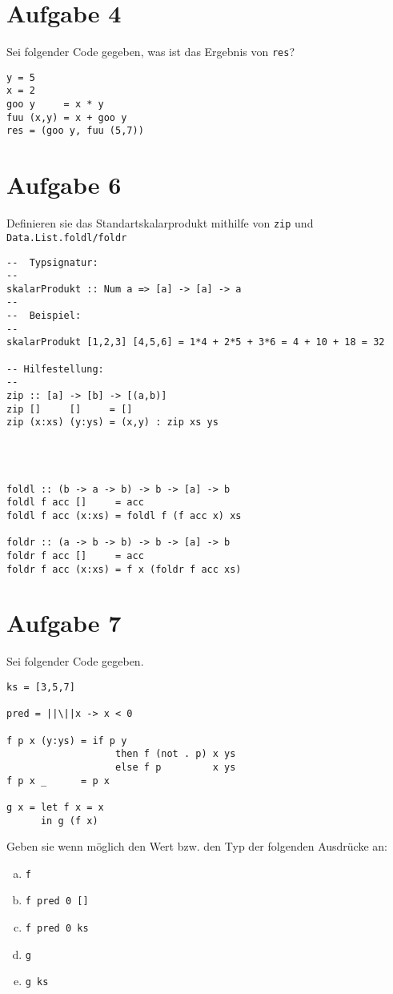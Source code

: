 \documentclass{article}
\begin{document}
\section*{Aufgabe 4}
Sei folgender Code gegeben, was ist das Ergebnis von \texttt{res}?
\begin{verbatim}
y = 5
x = 2
goo y     = x * y
fuu (x,y) = x + goo y
res = (goo y, fuu (5,7))
\end{verbatim}

\section*{Aufgabe 6}
Definieren sie das Standartskalarprodukt mithilfe von \texttt{zip} und \texttt{Data.List.foldl/foldr}

\begin{verbatim}
--  Typsignatur:
--
skalarProdukt :: Num a => [a] -> [a] -> a
--
--  Beispiel:
--
skalarProdukt [1,2,3] [4,5,6] = 1*4 + 2*5 + 3*6 = 4 + 10 + 18 = 32

-- Hilfestellung:
--
zip :: [a] -> [b] -> [(a,b)]
zip []     []     = []
zip (x:xs) (y:ys) = (x,y) : zip xs ys




foldl :: (b -> a -> b) -> b -> [a] -> b
foldl f acc []     = acc
foldl f acc (x:xs) = foldl f (f acc x) xs

foldr :: (a -> b -> b) -> b -> [a] -> b
foldr f acc []     = acc
foldr f acc (x:xs) = f x (foldr f acc xs)
\end{verbatim}

\section*{Aufgabe 7}
Sei folgender Code gegeben.
\begin{verbatim}
ks = [3,5,7]

pred = ||\||x -> x < 0

f p x (y:ys) = if p y
                   then f (not . p) x ys
                   else f p         x ys
f p x _      = p x

g x = let f x = x
      in g (f x)
\end{verbatim}

Geben sie wenn möglich den Wert bzw. den Typ der folgenden Ausdrücke an:

\begin{enumerate} [a)]
    \item \texttt{f} \\[2mm]
    \item \texttt{f pred 0 []} \\[2mm]
    \item \texttt{f pred 0 ks} \\[2mm]
    \item \texttt{g} \\[2mm]
    \item \texttt{g ks} \\[2mm]
\end{enumerate}
\end{document}
